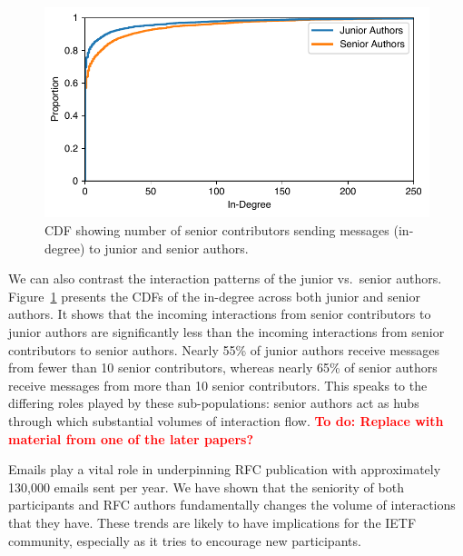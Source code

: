 \documentclass[twocolumn,10pt]{article}
\newlength{\figureWidthOneColumn}
\newcommand{\todo}[1]{\textbf{\textcolor{red}{To do: #1}}}
\newcommand{\pb}[1]{\vspace{0.75ex}\noindent{\textbf{#1}}}
\begin{document}
\begin{figure}
  \centering
  \includegraphics[width=\figureWidthOneColumn]{figures-prev/imc-2021/emails/junior_senior_authors_seniormem_indegree.pdf}
  \caption{
    CDF showing number of senior contributors sending messages (in-degree)
    to junior and senior authors.
  }
  \label{fig:junior_senior_indegree_seniormem}
\end{figure}

We can also contrast the interaction patterns of the junior vs.\ senior
authors. Figure~\ref{fig:junior_senior_indegree_seniormem} presents the
CDFs of the in-degree across both junior and senior authors.  It shows that
the incoming interactions from senior contributors to junior authors are
significantly less than the incoming interactions from senior contributors
to senior authors. Nearly 55\% of junior authors receive messages from
fewer than 10 senior contributors, whereas nearly 65\% of senior authors
receive messages from more than 10 senior contributors.  This speaks to the
differing roles played by these sub-populations: senior authors act as hubs
through which substantial volumes of interaction flow.
\todo{Replace with material from one of the later papers?}

\pb{Summary:}
Emails play a vital role in underpinning RFC publication with approximately
130,000 emails sent per year. We have shown that the seniority of both
participants and RFC authors fundamentally changes the volume of
interactions that they have. These trends are likely to have implications
for the IETF community, especially as it tries to encourage new
participants.



\end{document}
